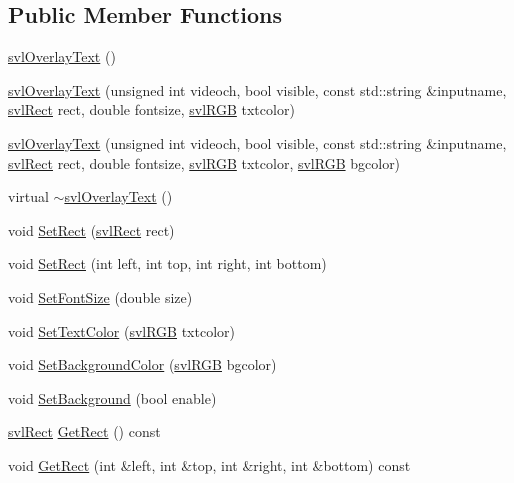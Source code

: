 \subsection*{Public Member Functions}
\begin{DoxyCompactItemize}
\item 
\hyperlink{classsvl_overlay_text_ae1327a383869cc21cf487319a3174431}{svl\-Overlay\-Text} ()
\item 
\hyperlink{classsvl_overlay_text_a938fd213b6579b8137c90ab8b51cdd0a}{svl\-Overlay\-Text} (unsigned int videoch, bool visible, const std\-::string \&inputname, \hyperlink{structsvl_rect}{svl\-Rect} rect, double fontsize, \hyperlink{structsvl_r_g_b}{svl\-R\-G\-B} txtcolor)
\item 
\hyperlink{classsvl_overlay_text_a1a41ff608dff4576246038f1369d33a9}{svl\-Overlay\-Text} (unsigned int videoch, bool visible, const std\-::string \&inputname, \hyperlink{structsvl_rect}{svl\-Rect} rect, double fontsize, \hyperlink{structsvl_r_g_b}{svl\-R\-G\-B} txtcolor, \hyperlink{structsvl_r_g_b}{svl\-R\-G\-B} bgcolor)
\item 
virtual \hyperlink{classsvl_overlay_text_acd6eea3c134bfa6a46454fcee10988a0}{$\sim$svl\-Overlay\-Text} ()
\item 
void \hyperlink{classsvl_overlay_text_a17d55a3f560cc4359d6068aca082e3cc}{Set\-Rect} (\hyperlink{structsvl_rect}{svl\-Rect} rect)
\item 
void \hyperlink{classsvl_overlay_text_a8bbed7dbfd22e6265fae8c08aec59715}{Set\-Rect} (int left, int top, int right, int bottom)
\item 
void \hyperlink{classsvl_overlay_text_a0835489891507d3ee13122341c96cfcc}{Set\-Font\-Size} (double size)
\item 
void \hyperlink{classsvl_overlay_text_a127f13097d41aed69bf9166bc5d86ca5}{Set\-Text\-Color} (\hyperlink{structsvl_r_g_b}{svl\-R\-G\-B} txtcolor)
\item 
void \hyperlink{classsvl_overlay_text_a21954c0fd5e72f2f7699b95de9a8168d}{Set\-Background\-Color} (\hyperlink{structsvl_r_g_b}{svl\-R\-G\-B} bgcolor)
\item 
void \hyperlink{classsvl_overlay_text_aa50bd14abb4c29f74dcac72674a03f6c}{Set\-Background} (bool enable)
\item 
\hyperlink{structsvl_rect}{svl\-Rect} \hyperlink{classsvl_overlay_text_a7ae544b4a8dd4f1f39dce71d14f3fc9a}{Get\-Rect} () const 
\item 
void \hyperlink{classsvl_overlay_text_a026ac52a3b59318448011a6a2a90c8a1}{Get\-Rect} (int \&left, int \&top, int \&right, int \&bottom) const 

\end{DoxyCompactItemize}
